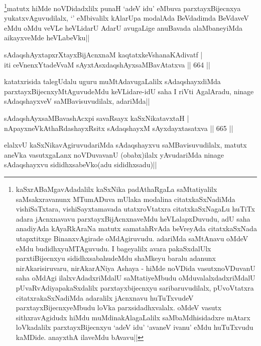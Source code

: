 \begin{artha}
\footnote{kaSxrABaMgavAdadalilx kaSxNika padAthaRgaLa saMtatiyalilx saMsakxravanunx MTumADuva mUlaka modalina citatxkaSxNadiMda vishiSaTxtara, vishiSayxtamavada utatxroVtatxra citatxkaSxNagaLu huTiTx adara jAcnxnavavu parxtayxBijAcnxnaveMdu heVLalapxDuvudu, adU saha anadiyAda kAyaRkAraNa matutx samatahRvAda beVreyAda citatxkaSxNada utapxtitxge BinanxvAgirade oMdAgiruvudu. adariMda saMtAnavu oMdeV eMdu budidhxyuMTAguvudu. I bageyalilx avara pakaSxdalUlx parxtiBijecnxyu sididhxsabahudeMdu shaMkeyu baralu adanunx nirAkarisiruvaru, nirAkarANiya Ashaya - hiMde noVDida vasutxnoVDuvanU saha oMdAgi ilalxvAdadxriMdalU saMtatiyeMbudu oMduvalalxdadxriMdalU pUvaRvAdiyapakaSxdalilx parxtayxbijecnxyu saribaruvudilalx, pUvoVtatxra citatxrakaSxNadiMda adaralilx jAcnxnavu huTuTxvudeV parxtayxBijecnxyeMbudu loVka parxsidadhxvalalx. oMdeV vasutx sithxravAgidudx hiMdu muMdinakAlagaLalilx saMbaMdhisidadxre mAtarx loVkadalilx parxtayxBijecnxyu `adeV idu'  `avaneV ivanu' eMdu huTuTxvudu kaMDide. anayxthA ilaveMdu bAvavu||}matutx hiMde noVDidadxlilx punaH `adeV idu' eMbuva parxtayxBijecnxya yukatxvAguvudilalx, `\stext' eMbivalilx kAlarUpa modalAda BeVdadimda BeVdaveV eMdu oMdu veVLe heVLidarU AdarU avugaLige anuBavada alaMbaneyiMda aikayxveMde heVLabeVku||
\end{artha}


\begin{shl}
sAdaqshAyxtapxrXtayxBijAcnxnaM kaqtatxkeVshanaKAdivatf | \\
iti ceVnenxYtadeVvaM sAyxtAsxdaqshAyxsaMBavAtatxva \hfill||  664 ||  
\end{shl}

\begin{artha}
katatxrisida talegUdalu uguru muMtAdavugaLalilx sAdaqshayxdiMda parxtayxBijecnxyMtAguvudeMdu keVLidare-idU saha I riVti AgalAradu, ninage sAdaqshayxveV saMBavisuvudilalx, adariMda||
\end{artha}


\begin{shl}
sAdaqshAyxsaMBavashAcxpi savaRsayx kaSxNikatavxtaH | \\
nApayxneVkAthaRdashayxRsitx sAdaqshayxM sAyxdayxtasatxva \hfill||  665 ||  
\end{shl}

\begin{artha}
elalxvU kaSxNikavAgiruvudariMda sAdaqshayxvu saMBavisuvudilalx, matutx aneVka vasutxgaLanx noVDuvavanU (obabx)ilalx yAvudariMda ninage sAdaqshayxvu sididhxsabeVko(adu sididhxsadu)||
\end{artha}

